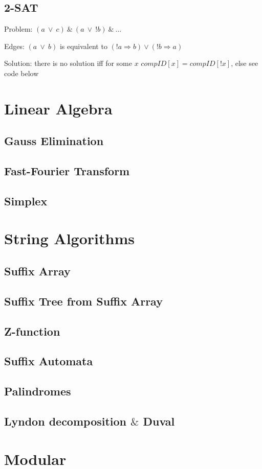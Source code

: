 \documentclass[10pt]{article}
\begin{document}
\subsection{2-SAT}
Problem: $(a ~ \vee ~ c) ~ \& ~ (a ~ \vee ~ !b) ~\& ~\ldots$

Edges: $(a ~ \vee ~ b)$ is equivalent to $(!a \Rightarrow b) \vee (!b \Rightarrow a)$

Solution: there is no solution iff for some $x$ $compID[x] = compID[!x]$, else see code below




\newpage
\section{Linear Algebra}
\subsection{Gauss Elimination}

\subsection{Fast-Fourier Transform}

\subsection{Simplex}




\newpage
\section{String Algorithms}
\subsection{Suffix Array}

\subsection{Suffix Tree from Suffix Array}

\subsection{Z-function}

\subsection{Suffix Automata}

\subsection{Palindromes}

\subsection{Lyndon decomposition $\&$ Duval}




\newpage
\section{Modular}

\end{document}
